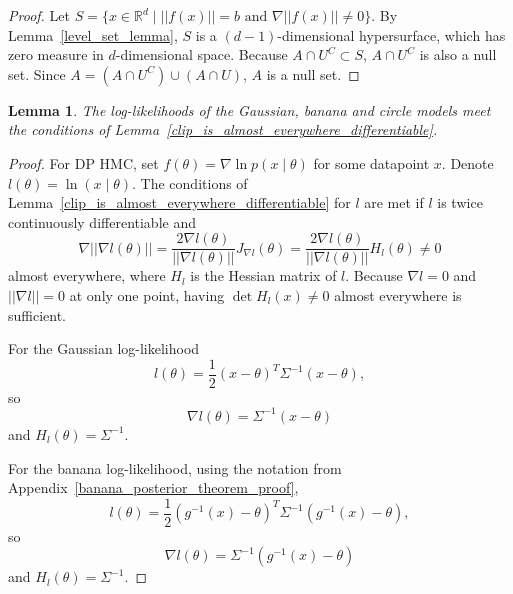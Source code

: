\documentclass[english,twoside,openright]{HYgraduMLDS}
\newtheorem{lemma}{Lemma}
\newcommand{\R}{\mathbb{R}}
\begin{document}
\begin{appendices}
\begin{proof}
  Let \(S = \{x\in \R^{d}\mid ||f(x)|| = b \text{ and } \nabla ||f(x)|| \neq 0\}\).
  By Lemma~\ref{level_set_lemma},
  \(S\) is a \((d-1)\)-dimensional hypersurface, which has zero measure
  in \(d\)-dimensional space. Because \(A\cap U^{C} \subset S\), \(A\cap U^{C}\)
  is also a null set. Since \(A = (A\cap U^{C}) \cup (A\cap U)\),
  \(A\) is a null set.


\end{proof}

\begin{lemma}\label{model_clip_ok_lemma}
  The log-likelihoods of the Gaussian, banana and circle models meet the
  conditions of Lemma~\ref{clip_is_almost_everywhere_differentiable}.
\end{lemma}
\begin{proof}
  For DP HMC, set \(f(\theta) = \nabla \ln p(x\mid \theta)\) for some
  datapoint \(x\). Denote \(l(\theta) = \ln (x\mid \theta)\).
  The conditions of
  Lemma~\ref{clip_is_almost_everywhere_differentiable} for \(l\) are met if
  \(l\) is twice continuously differentiable and
  \[
    \nabla ||\nabla l(\theta)||
    = \frac{2\nabla l(\theta)}{||\nabla l(\theta)||}J_{\nabla l}(\theta)
    = \frac{2\nabla l(\theta)}{||\nabla l(\theta)||}H_{l}(\theta) \neq 0
  \]
  almost everywhere,
  where \(H_{l}\) is the Hessian matrix of \(l\). Because \(\nabla l = 0\) and
  \(||\nabla l|| = 0\) at only one point, having \(\det H_{l}(x) \neq 0\)
  almost everywhere is sufficient.

  For the Gaussian log-likelihood
  \[
    l(\theta) = \frac{1}{2}(x - \theta)^{T}\Sigma^{-1}(x - \theta),
  \]
  so
  \[
    \nabla l(\theta) = \Sigma^{-1}(x - \theta)
  \]
  and \(H_{l}(\theta) = \Sigma^{-1}\).

  For the banana log-likelihood, using the notation from
  Appendix~\ref{banana_posterior_theorem_proof},
  \[
    l(\theta) = \frac{1}{2}(g^{-1}(x) - \theta)^{T}\Sigma^{-1}(g^{-1}(x) - \theta),
  \]
  so
  \[
    \nabla l(\theta) = \Sigma^{-1}(g^{-1}(x) - \theta)
  \]
  and \(H_{l}(\theta) = \Sigma^{-1}\).


\end{proof}
\end{appendices}
\end{document}
